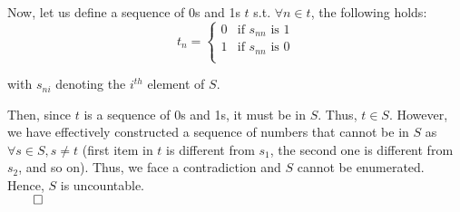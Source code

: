 \documentclass[11pt]{article}
\begin{document}
\begin{itemize}
        Now, let us define a sequence of 0s and 1s $t$ s.t. $\forall n \in t$,
        the following holds:
        \begin{equation*}
            t_n =
            \begin{cases}
                0 & \text{if } s_{nn} \text{ is } 1\\
                1 & \text{if } s_{nn} \text{ is } 0\\
            \end{cases}
        \end{equation*}

        with $s_{ni}$ denoting the $i^{th}$ element of $S$.

        Then, since $t$ is a sequence of 0s and 1s, it must be in $S$. Thus, $t
        \in S$. However, we have effectively constructed a sequence of numbers
        that cannot be in $S$ as $\forall s \in S, s \neq t$ (first item in $t$
        is different from $s_1$, the second one is different from $s_2$, and so
        on). Thus, we face a contradiction and $S$ cannot be enumerated. Hence,
        $S$ is uncountable.\\
        $\qed$
\end{itemize}

\end{document}
